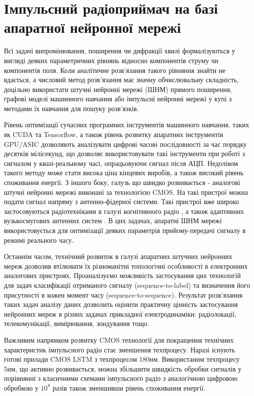 \section{Імпульсний радіоприймач на базі апаратної нейронної мережі}

Всі задачі випромінювання, поширення чи дифракції хвилі формалізуються
у вигляді деяких параметричних рівнянь відносно компонентів струму чи 
компонентів поля. Коли аналітичне розв'язання такого рівняння знайти не 
вдається, а числовий метод розв'язання має значну обчислювальну складність, 
доцільно використати штучні нейронні мережі (ШНМ) прямого поширення, графові 
моделі машинного навчання або імпульсні нейронні мережі у купі з методами їх 
навчання для пошуку розв'язків.

Рівень оптимізації сучасних програмних інструментів машинного навчання, таких 
як CUDA та Tensorflow, а також рівень розвитку апаратних інструментів GPU/ASIC
дозволяють аналізувати цифрові часові послідовності за час порядку 
десятків мілісекунд, що дозволяє використовувати такі інструменти при роботі 
з сигналом у квазі-реальному часі, опрацьовуючи сигнал після АЦП. Недоліком 
такого методу може стати висока ціна кінцевих виробів, а також високий 
рівень споживання енергії. З іншого боку, галузь що швидко розвивається - 
аналогові штучні нейронні мережі виконані за технологією CMOS. На такі 
пристрої можна подати сигнал напряму з антенно-фідерної системи. Такі 
пристрої вже широко застосовуються радіотехніками в галузі когнітивного 
радіо \cite{imp:Husseini2010}, а також адаптивних вузькосмугових антенних 
систем \cite{imp:Zbynek2002}. В цих задачах, апаратні ШНМ мережі 
використовується для оптимізації деяких параметрів прийому-передачі сигналу 
в режимі реального часу.

Останнім часом, технічний розвиток в галузі апаратних штучних нейронних мереж 
дозволив втілювати їх різноманітні топологічні особливості в електронних 
аналогових пристроях. Проаналізуємо можливість застосування цих технологій для 
задач класифікації отриманого сигналу (sequence-to-label) та визначення його 
присутності в кожен момент часу (sequence-to-sequence). Результат розв'язання 
таких задач аналізу даних дозволить оцінити практичну цінність застосування 
нейронних мереж в різних задачах прикладної електродинаміки: радіолокації, 
телекомунікації, вимірювання, зондування тощо. 

Важливим напрямком розвитку CMOS технології для покращення технічних 
характеристик імпульсного радіо стає зменшення техпроцесу. Наразі існують
готові прилади CMOS LSTM з техпроцесом 180нм. Використаннм техпроцесу 5нм,
що активно розвивається, можна збільшити швидкість обробки сигналів у 
порівнянні з класичними схемами імпульсного радіо з аналогічною цифровою 
обробкою у $ 10^8 $ разів також зменшивши рівень споживання енергії.

